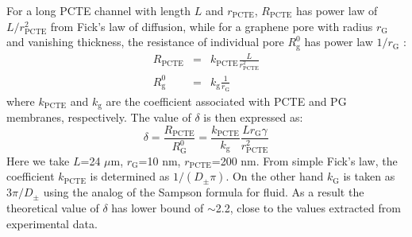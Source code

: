 For a long PCTE channel with length $L$ and $r_{\mathrm{PCTE}}$,
$R_{\mathrm{PCTE}}$ has power law of $L/r_{\mathrm{PCTE}}^{2}$ from
Fick's law of diffusion, while for a graphene pore with radius
$r_{\mathrm{G}}$ and vanishing thickness, the resistance of individual
pore $R_{\mathrm{g}}^{0}$ has power law $1/r_{\mathrm{G}}$
\cite{O_Hern_2014}:
\begin{subequations}
\begin{eqnarray}
  \label{eq:np-R-both}
  R_{\mathrm{PCTE}} &= &k_{\mathrm{PCTE}} \frac{L}{r_{\mathrm{PCTE}}^{2}} \\
  R_{\mathrm{g}}^{0} &= &k_{\mathrm{g}} \frac{1}{r_{\mathrm{G}}}
\end{eqnarray}
\end{subequations}
where $k_{\mathrm{PCTE}}$ and $k_{\mathrm{g}}$ are the coefficient
associated with PCTE and PG membranes, respectively. The value of
$\delta$ is then expressed as:
\begin{equation}
  \label{eq:np-delta-resistance}
  \delta
  = \frac{R_{\mathrm{PCTE}}}{R_{\mathrm{G}}^{0}}
  = {\displaystyle
    \frac{k_{\mathrm{PCTE}}}{k_{\mathrm{g}}}
    \frac{L r_{\mathrm{G}} \gamma}
        {r_{\mathrm{PCTE}}^{2}}}
\end{equation}
Here we take $L$=24 $\mu$m, $r_{\mathrm{G}}$=10 nm,
$r_{\mathrm{PCTE}}$=200 nm. From simple Fick's law, the coefficient
$k_{\mathrm{PCTE}}$ is determined as $1/(D_{\mathrm{\pm}} \pi)$. On
the other hand $k_{\mathrm{G}}$ is taken as $3 \pi / D_{\mathrm{\pm}}$
using the analog of the Sampson formula for
fluid\cite{Roscoe_1949_sampson_formula}. As a result the theoretical
value of $\delta$ has lower bound of $\sim$2.2, close to the values
extracted from experimental data.

  





